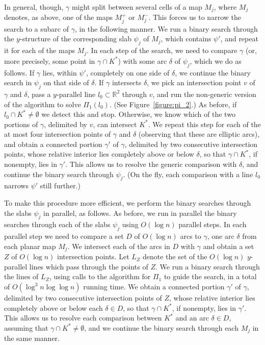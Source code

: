 \documentclass[a4paper,12pt]{article}
\begin{document}
In general, though, $\gamma$ might split between several cells of a
map $M_j$, where $M_j$ denotes, as above, one of the maps $M_j^+$ or
$M_j^-$. This forces us to narrow the search to a subarc of
$\gamma$, in the following manner. We run a binary search through
the $y$-structure of the corresponding slab $\psi_j$ of $M_j$, which
contains $\psi'$, and repeat it for each of the maps $M_j$. In each
step of the search, we need to compare $\gamma$ (or, more precisely,
some point in $\gamma \cap K^*$) with some arc $\delta$ of $\psi_j$,
which we do as follows. If $\gamma$ lies, within $\psi'$, completely
on one side of $\delta$, we continue the binary search in $\psi_j$
on that side of $\delta$. If $\gamma$ intersects $\delta$, we pick
an intersection point $v$ of $\gamma$ and $\delta$, pass a
$y$-parallel line $l_0 \subset \mathbb{R}^2$ through $v$, and run
the non-generic version of the algorithm to solve $\Pi_1(l_0)$. (See
Figure~\ref{figure:pi_2}.) As before, if $l_0 \cap K^* \neq
\emptyset$ we detect this and stop. Otherwise, we know which of the
two portions of $\gamma$, delimited by $v$, can intersect $K^*$. We
repeat this step for each of the at most four intersection points of
$\gamma$ and $\delta$ (observing that these are elliptic arcs), and
obtain a connected portion $\gamma'$ of $\gamma$, delimited by two
consecutive intersection points, whose relative interior lies
completely above or below $\delta$, so that $\gamma \cap K^*$, if
nonempty, lies in $\gamma'$. This allows us to resolve the generic
comparison with $\delta$, and continue the binary search through
$\psi_j$. (On the fly, each comparison with a line $l_0$ narrows
$\psi'$ still further.)

To make this procedure more efficient, we perform the binary
searches through the slabs $\psi_j$ in parallel, as follows. As
before, we run in parallel the binary searches through each of the
slabs $\psi_j$ using $O(\log n)$ parallel steps. In each parallel
step we need to compare a set $D$ of $O(\log n)$ arcs to $\gamma$,
one arc $\delta$ from each planar map $M_j$. We intersect each of
the arcs in $D$ with $\gamma$ and obtain a set $Z$ of $O(\log n)$
intersection points. Let $L_Z$ denote the set of the $O(\log n)$
$y$-parallel lines which pass through the points of $Z$. We run a
binary search through the lines of $L_Z$, using calls to the
algorithm for $\Pi_1$ to guide the search, in a total of $O(\log^3 n
\log \log n)$ running time. We obtain a connected portion $\gamma'$
of $\gamma$, delimited by two consecutive intersection points of
$Z$, whose relative interior lies completely above or below each
$\delta \in D$, so that $\gamma \cap K^*$, if nonempty, lies in
$\gamma'$. This allows us to resolve each comparison between $K^*$
and an arc $\delta \in D$, assuming that $\gamma \cap K^* \neq
\emptyset$, and we continue the binary search through each $M_j$ in
the same manner.
\end{document}
